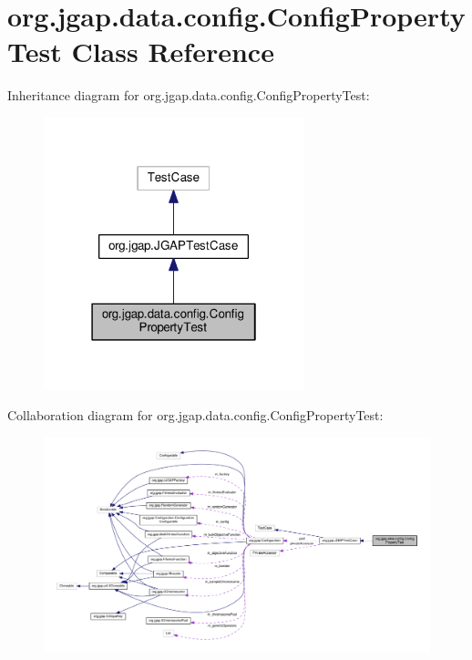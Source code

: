 \hypertarget{classorg_1_1jgap_1_1data_1_1config_1_1_config_property_test}{\section{org.\-jgap.\-data.\-config.\-Config\-Property\-Test Class Reference}
\label{classorg_1_1jgap_1_1data_1_1config_1_1_config_property_test}
}


Inheritance diagram for org.\-jgap.\-data.\-config.\-Config\-Property\-Test\-:
\nopagebreak
\begin{figure}[H]
\begin{center}
\leavevmode
\includegraphics[width=214pt]{classorg_1_1jgap_1_1data_1_1config_1_1_config_property_test__inherit__graph}
\end{center}
\end{figure}


Collaboration diagram for org.\-jgap.\-data.\-config.\-Config\-Property\-Test\-:
\nopagebreak
\begin{figure}[H]
\begin{center}
\leavevmode
\includegraphics[width=350pt]{classorg_1_1jgap_1_1data_1_1config_1_1_config_property_test__coll__graph}
\end{center}
\end{figure}
